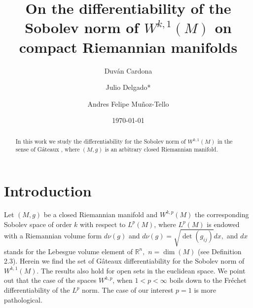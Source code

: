 \documentclass[a4paper,12pt,reqno]{amsart}%
\theoremstyle{definition}
\numberwithin{equation}{section}
\numberwithin{theorem}{section}
\newcommand{\arn}{{\mathbb{R}}^n}
\begin{document}
\title[On the differentiability of the Sobolev norm of $W^{k,1}(M)$ ]{On the differentiability of the Sobolev norm of $W^{k,1}(M)$ on  compact Riemannian manifolds}
\author[D. Cardona]{Duv\'an Cardona}
\address{
  Duv\'an Cardona:
  \endgraf
  Department of Mathematics: Analysis, Logic and Discrete Mathematics
  \endgraf
  Ghent University, Belgium
  \endgraf
  {\it E-mail address} {\rm duvanc306@gmail.com, duvan.cardonasanchez@ugent.be}
  }
  
  \author[J. Delgado]{Julio Delgado*}
\address{
  (*Corresponding Author) Julio Delgado:
  \endgraf
  Departamento de Matem\'aticas
  \endgraf
  Universidad del Valle
  \endgraf
  Cali-Colombia
    \endgraf
    {\it E-mail address} {\rm delgado.julio@correounivalle.edu.co}
  }

  \author[A Munoz]{Andres Felipe Muñoz-Tello}
\address{
   Andres Felipe Muñoz-Tello:
  \endgraf
  Facultad de Ciencias Basicas
  \endgraf
  Universidad Santiago de Cali
  \endgraf
  Cali-Colombia
    \endgraf
    {\it E-mail address} {\rm  andres.munoz00@usc.edu.co}
  }




\date{\today}

\begin{abstract}
    In this work we study the differentiability for  the Sobolev norm  of $W^{k,1}(M)$ in the sense of G\^ateaux , where $(M,g)$ is an arbitrary closed Riemannian manifold.
\end{abstract}

\maketitle

\section{Introduction}

Let $(M,g)$ be a closed Riemannian manifold and $W^{k,p}(M)$ the corresponding Sobolev space of order $k$ with respect to $L^p(M)$, where  $L^p(M)$ is endowed with  a Riemannian volume form $d\nu(g)$ and $d\nu(g)=\sqrt{\det(g_{ij})}dx,$ and $dx$ stands for the Lebesgue volume element of $\mathbb{R}^n,$ $n=\dim(M)$ (see Definition 2.3).  Herein we find the set of G\^ateaux differentiability for  the Sobolev norm  of $W^{k,1}(M)$. The results also hold for open sets in the euclidean space. We point out  that the case of the spaces $W^{k,p}$, when $1<p<\infty$ boils down to the Fr\'echet differentiability of the $L^p$ norm. The case of our interest  $p=1$ is more pathological. \\
\end{document}
